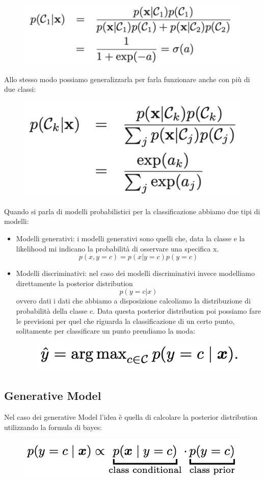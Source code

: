 \documentclass[14pt]{extreport}
\begin{document}
\begin{figure}[H]
\centering
\includegraphics[width=0.5\linewidth]{199.jpeg}
\end{figure}

Allo stesso modo possiamo generalizzarla per farla funzionare anche con più di due classi:

\begin{figure}[H]
\centering
\includegraphics[width=0.34\linewidth]{200.jpeg}
\end{figure}

Quando si parla di modelli probabilistici per la classificazione abbiamo due tipi di modelli:
\begin{itemize}
\item Modelli generativi: i modelli generativi sono quelli che, data la classe e la likelihood mi indicano la probabilità di osservare una specifica
x. $$p(x, y=c) = p(x|y=c)p(y=c)$$
\item Modelli discriminativi: nel caso dei modelli discriminativi invece modelliamo direttamente la posterior distribution $$p(y=c|x)$$ ovvero dati i
dati che abbiamo a disposizione calcoliamo la distribuzione di probabilità della classe c. Data questa posterior distribution poi possiamo fare le
previsioni per quel che riguarda la classificazione di un certo punto, solitamente per classificare un punto prendiamo la moda: \begin{figure}[H]
\centering
\includegraphics[width=0.5\linewidth]{157.jpeg}
\end{figure}
\end{itemize}

\subsection{Generative Model}

Nel caso dei generative Model l'idea è quella di calcolare la posterior distribution utilizzando la formula di bayes:
\begin{figure}[H]
\centering
\includegraphics[width=0.5\linewidth]{158.jpeg}
\end{figure}
\end{document}
